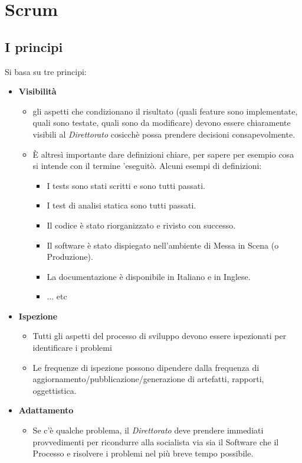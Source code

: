 \chapter{Scrum}

\section{I principi}

Si basa su tre principi:
\begin{itemize}
  \item \textbf{Visibilit\`a}
  \begin{itemize}
    \item gli aspetti che condizionano il risultato (quali feature sono implementate, quali sono testate, quali sono da modificare) devono essere chiaramente visibili al \textit{Direttorato} cosicch\`e possa prendere decisioni consapevolmente.
    \item \`E altres\`i importante dare definizioni chiare, per sapere per esempio cosa si intende con il termine 'eseguit\`o. Alcuni esempi di definizioni:
    \begin{itemize}
      \item I tests sono stati scritti e sono tutti passati.
      \item I test di analisi statica sono tutti passati.
      \item Il codice \`e stato riorganizzato e rivisto con successo.
      \item Il software \`e stato dispiegato nell'ambiente di Messa in Scena (o Produzione).
      \item La documentazione \`e disponibile in Italiano e in Inglese.
      \item ... etc
    \end{itemize}
  \end{itemize}
  \item \textbf{Ispezione}
  \begin{itemize}
    \item Tutti gli aspetti del processo di sviluppo devono essere ispezionati per identificare i problemi
    \item Le frequenze di ispezione possono dipendere dalla frequenza di aggiornamento/pubblicazione/generazione di artefatti, rapporti, oggettistica.
  \end{itemize}
  \item \textbf{Adattamento}
  \begin{itemize}
    \item Se c'\`e qualche problema, il \textit{Direttorato} deve prendere immediati provvedimenti per ricondurre alla socialista via sia il Software che il Processo e risolvere i problemi nel pi\`u breve tempo possibile.
  \end{itemize}
\end{itemize}

